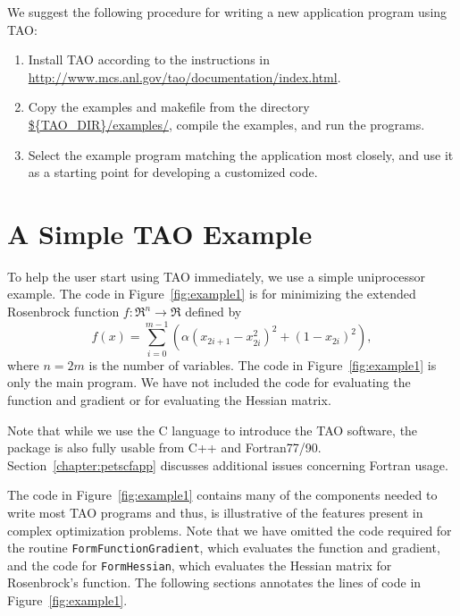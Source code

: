 We suggest the following procedure for writing a new application
program using TAO:

\begin{enumerate}
\item Install TAO according to the instructions in
  \url{http://www.mcs.anl.gov/tao/documentation/index.html}.
\item Copy the examples and makefile from the directory
  \url{${TAO\_DIR}/examples/}, compile the examples, and run the
  programs.
\item Select the example program matching the application most
  closely, and use it as a starting point for developing a customized
  code.
\end{enumerate}

\section{A Simple TAO Example}
\label{sec:simple}

To help the user start using TAO immediately, we use a simple
uniprocessor example. The code in
Figure~\ref{fig:example1} is for minimizing the
extended Rosenbrock function $f: \Re^n \to \Re$ defined by
\[
 f(x) = 
 \sum_{i=0}^{m-1} \left( \alpha(x_{2i+1}-x_{2i}^2)^2 + (1-x_{2i})^2 \right),
\]
where $n = 2m$ is the number of variables.  The code in
Figure~\ref{fig:example1} is only the main program.  We have not
included the code for evaluating the function and gradient or
for evaluating the Hessian matrix.


Note that while we use the C language to introduce the TAO software,
the package is also fully usable from C++ and Fortran77/90.
Section~\ref{chapter:petscfapp} discusses additional issues concerning
Fortran usage.

The code in Figure~\ref{fig:example1} contains many of the components
needed to write most TAO programs and thus, is illustrative of the
features present in complex optimization problems.  Note that we have
omitted the code required for the routine \texttt{FormFunctionGradient},
which evaluates the function and gradient, and the code for
\texttt{FormHessian}, which evaluates the Hessian matrix for Rosenbrock's
function.  The following sections annotates the lines of code in
Figure~\ref{fig:example1}.

